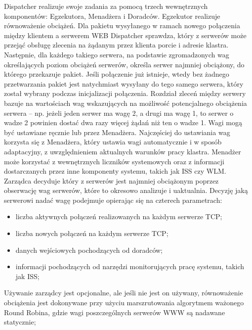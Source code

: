 Dispatcher realizuje swoje zadania za pomocą trzech wewnętrznych komponentów: Egzekutora, Menadżera i Doradców. Egzekutor 
realizuje równoważenie obciążeń. Dla pakietu wysyłanego w ramach nowego połączenia między klientem a serwerem WEB Dispatcher 
sprawdza, który z serwerów może przejąć obsługę zlecenia na żądanym przez klienta porcie i adresie klastra. Następnie, dla 
każdego takiego serwera, na podstawie zgromadzonych wag określających poziom obciążeń serwerów, określa serwer najmniej 
obciążony, do którego przekazuje pakiet. Jeśli połączenie już istnieje, wtedy bez żadnego przetwarzania pakiet jest natychmiast
wysyłany do tego samego serwera, który został wybrany podczas inicjalizacji połączenia. Rozdział zleceń między serwery bazuje 
na wartościach wag wskazujących na możliwość potencjalnego obciążenia serwera -- np. jeżeli jeden serwer ma wagę 2, a drugi ma 
wagę 1, to serwer o wadze 2 powinien dostać dwa razy więcej żądań niż ten o wadze 1. Wagi mogą być ustawiane ręcznie lub przez 
Menadżera. Najczęściej do ustawiania wag korzysta się z Menadżera, który ustawia wagi automatycznie i w sposób adaptacyjny, z 
uwzględnieniem aktualnych warunków pracy klastra. Menadżer może korzystać z wewnętrznych liczników systemowych oraz z 
informacji dostarczanych przez inne komponenty systemu, takich jak ISS czy WLM. Zarządca decyduje który z serwerów jest 
najmniej obciążonym poprzez obserwację wag serwerów, które to okresowo analizuje i uaktualnia. Decyzję jaką serwerowi nadać 
wagę podejmuje opierając się na czterech parametrach:
\begin{itemize}
\item liczba aktywnych połączeń realizowanych na każdym serwerze TCP;
\item liczba nowych połączeń na każdym serwerze TCP;
\item danych wejściowych pochodzących od doradców;
\item informacji pochodzących od narzędzi monitorujących pracę systemu, takich jak ISS;
\end{itemize}

Używanie zarządcy jest opcjonalne, ale jeśli 
nie jest on używany, równoważenie obciążenia jest dokonywane przy użyciu marszrutowania algorytmem ważonego Round Robina, 
gdzie wagi poszczególnych serwerów WWW są nadawane statycznie; 

